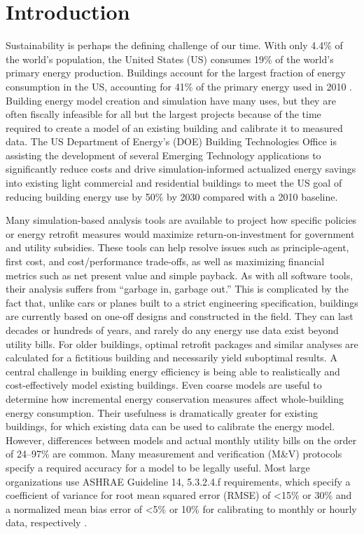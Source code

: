 \documentclass[preprint, review, 12pt]{elsarticle}
\begin{document}
\section{Introduction}
\label{sec:introduction}
Sustainability is perhaps the defining challenge of our time. With only 4.4\% of the world's population, the United States (US) consumes 19\% of the world's primary energy production. Buildings account for the largest fraction of energy consumption in the US, accounting for 41\% of the primary energy used in 2010 \cite{cit:doe2012a}. Building energy model creation and simulation have many uses, but they are often fiscally infeasible for all but the largest projects because of the time required to create a model of an existing building and calibrate it to measured data. The US Department of Energy's (DOE) Building Technologies Office is assisting the development of several Emerging Technology applications to significantly reduce costs and drive simulation-informed actualized energy savings into existing light commercial and residential buildings to meet the US goal of reducing building energy use by 50\% by 2030 compared with a 2010 baseline.

Many simulation-based analysis tools are available \cite{cit:doetools2012} to project how specific policies or energy retrofit measures \cite{Chidiac20115037} would maximize return-on-investment for government and utility subsidies. These tools can help resolve issues such as principle-agent, first cost, and cost/performance trade-offs, as well as maximizing financial metrics such as net present value and simple payback. As with all software tools, their analysis suffers from ``garbage in, garbage out.'' This is complicated by the fact that, unlike cars or planes built to a strict engineering specification, buildings are currently based on one-off designs and constructed in the field. They can last decades or hundreds of years, and rarely do any energy use data exist beyond utility bills. For older buildings, optimal retrofit packages and similar analyses are calculated for a fictitious building and necessarily yield suboptimal results. A central challenge in building energy efficiency is being able to realistically and cost-effectively model existing buildings. Even coarse models are useful to determine how incremental energy conservation measures affect whole-building energy consumption. Their usefulness is dramatically greater for existing buildings, for which existing data can be used to calibrate the energy model. However, differences between models and actual monthly utility bills on the order of 24--97\% \cite{cit:earthadvantage2009,cit:roberts2012} are common. Many measurement and verification (M\&V) protocols specify a required accuracy for a model to be legally useful. Most large organizations use ASHRAE Guideline 14, 5.3.2.4.f requirements, which specify a coefficient of variance for root mean squared error (RMSE) of \textless 15\% or 30\% and a normalized mean bias error of \textless 5\% or 10\% for calibrating to monthly or hourly data, respectively \cite{cit:ashrae2002}.
\end{document}
